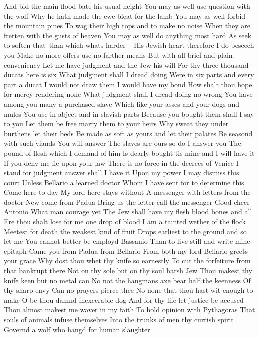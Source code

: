 And bid the main flood bate his usual height
You may as well use question with the wolf
Why he hath made the ewe bleat for the lamb
You may as well forbid the mountain pines
To wag their high tops and to make no noise
When they are fretten with the gusts of heaven
You may as well do anything most hard
As seek to soften that--than which whats harder --
His Jewish heart therefore I do beseech you
Make no more offers use no farther means
But with all brief and plain conveniency
Let me have judgment and the Jew his will
For thy three thousand ducats here is six
What judgment shall I dread doing
Were in six parts and every part a ducat
I would not draw them I would have my bond
How shalt thou hope for mercy rendering none
What judgment shall I dread doing no wrong
You have among you many a purchased slave
Which like your asses and your dogs and mules
You use in abject and in slavish parts
Because you bought them shall I say to you
Let them be free marry them to your heirs
Why sweat they under burthens let their beds
Be made as soft as yours and let their palates
Be seasond with such viands You will answer
The slaves are ours so do I answer you
The pound of flesh which I demand of him
Is dearly bought tis mine and I will have it
If you deny me fie upon your law
There is no force in the decrees of Venice
I stand for judgment answer shall I have it
Upon my power I may dismiss this court
Unless Bellario a learned doctor
Whom I have sent for to determine this
Come here to-day
My lord here stays without
A messenger with letters from the doctor
New come from Padua
Bring us the letter call the messenger
Good cheer Antonio What man courage yet
The Jew shall have my flesh blood bones and all
Ere thou shalt lose for me one drop of blood
I am a tainted wether of the flock
Meetest for death the weakest kind of fruit
Drops earliest to the ground and so let me
You cannot better be employd Bassanio
Than to live still and write mine epitaph
Came you from Padua from Bellario
From both my lord Bellario greets your grace
Why dost thou whet thy knife so earnestly
To cut the forfeiture from that bankrupt there
Not on thy sole but on thy soul harsh Jew
Thou makest thy knife keen but no metal can
No not the hangmans axe bear half the keenness
Of thy sharp envy Can no prayers pierce thee
No none that thou hast wit enough to make
O be thou damnd inexecrable dog
And for thy life let justice be accused
Thou almost makest me waver in my faith
To hold opinion with Pythagoras
That souls of animals infuse themselves
Into the trunks of men thy currish spirit
Governd a wolf who hangd for human slaughter
